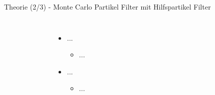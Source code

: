 \documentclass{beamer}
\begin{document}
\begin{frame}{Theorie (2/3) - Monte Carlo Partikel Filter mit Hilfspartikel Filter}
\begin{columns}
\begin{overlayarea}{\textwidth}{.9\textheight}
{\begin{figure}
						\caption{\cite{blanco2008pure}}
					\end{figure}
				}
			\end{overlayarea}		
			\begin{itemize}
				\item ...
					\begin{itemize}
						\item ...
					\end{itemize}
				\item ...
					\begin{itemize}
						\item ...
					\end{itemize}
			\end{itemize}
	\end{columns}
\end{frame}
\end{document}
